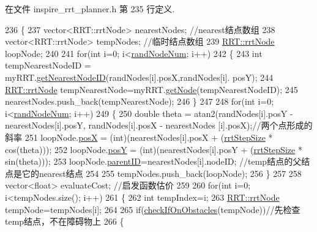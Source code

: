 在文件 inspire\-\_\-rrt\-\_\-planner.\-h 第 235 行定义.


\begin{DoxyCode}
236     \{
237         vector<RRT::rrtNode> nearestNodes;  \textcolor{comment}{//nearest结点数组}
238         vector<RRT::rrtNode> tempNodes;  \textcolor{comment}{//临时结点数组}
239         \hyperlink{structRRT_1_1rrtNode}{RRT::rrtNode} loopNode;
240 
241         \textcolor{keywordflow}{for}(\textcolor{keywordtype}{int} i=0; i<\hyperlink{rrt_8h_a962f9277eb583fb40d04a820752a9191}{randNodeNum}; i++)
242         \{
243             \textcolor{keywordtype}{int} tempNearestNodeID = myRRT.\hyperlink{classRRT_af35d650011a6b834fc1b2d75b879817c}{getNearestNodeID}(randNodes[i].posX,randNodes[i].
      posY);
244             \hyperlink{structRRT_1_1rrtNode}{RRT::rrtNode} tempNearestNode=myRRT.\hyperlink{classRRT_afde36442771a9552bb97572098396c2b}{getNode}(tempNearestNodeID);
245             nearestNodes.push\_back(tempNearestNode);
246         \}
247 
248         \textcolor{keywordflow}{for}(\textcolor{keywordtype}{int} i=0; i<\hyperlink{rrt_8h_a962f9277eb583fb40d04a820752a9191}{randNodeNum}; i++)
249         \{
250             \textcolor{keywordtype}{double} theta = atan2(randNodes[i].posY - nearestNodes[i].posY, randNodes[i].posX - nearestNodes
      [i].posX);\textcolor{comment}{//两个点形成的斜率}
251             loopNode.\hyperlink{structRRT_1_1rrtNode_a4c2096fa1d719cf2aa49cf21916a5a4b}{posX} = (int)(nearestNodes[i].posX + (\hyperlink{rrt_8h_aaac2d108c57a5722b9d816baaed80945}{rrtStepSize} * cos(theta)));
252             loopNode.\hyperlink{structRRT_1_1rrtNode_a219cf78a0f5689bc84744df52c37e84d}{posY} = (int)(nearestNodes[i].posY + (\hyperlink{rrt_8h_aaac2d108c57a5722b9d816baaed80945}{rrtStepSize} * sin(theta)));
253             loopNode.\hyperlink{structRRT_1_1rrtNode_a9f5b9bfca61e25fe7f80d361ed7996ff}{parentID}=nearestNodes[i].nodeID;  \textcolor{comment}{//temp结点的父结点是它的nearest结点}
254 
255             tempNodes.push\_back(loopNode);
256         \}
257 
258         vector<float> evaluateCost;  \textcolor{comment}{//启发函数估价}
259 
260         \textcolor{keywordflow}{for}(\textcolor{keywordtype}{int} i=0; i<tempNodes.size(); i++)
261         \{
262             \textcolor{keywordtype}{int} tempIndex=i;
263             \hyperlink{structRRT_1_1rrtNode}{RRT::rrtNode} tempNode=tempNodes[i];
264 
265             \textcolor{keywordflow}{if}(\hyperlink{classrrt__plan_1_1rrt__planner_a2b6ded4f6e7719510d94371400f097d7}{checkIfOnObstacles}(tempNode))\textcolor{comment}{//先检查temp结点，不在障碍物上}
266             \{

\end{DoxyCode}
